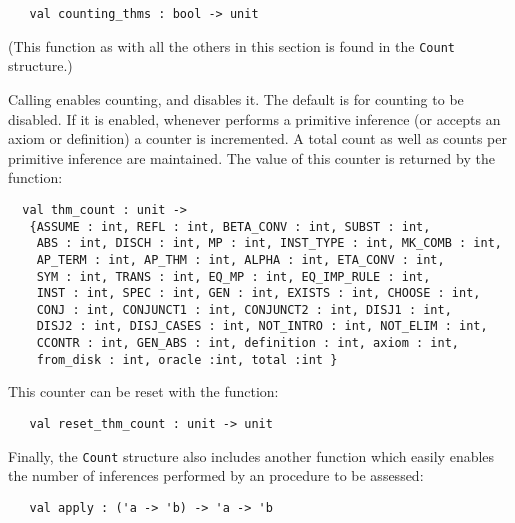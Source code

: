 \begin{holboxed}
\begin{verbatim}
   val counting_thms : bool -> unit
\end{verbatim}
\end{holboxed}

\noindent (This function as with all the others in this section is
found in the \texttt{Count} structure.)

Calling  enables counting, and
 disables it.  The default is for counting to
be disabled.  If it is enabled, whenever \HOL{} performs a primitive
inference (or accepts an axiom or definition) a counter is
incremented.  A total count as well as counts per primitive inference
are maintained.  The value of this counter is returned by the
function:

\begin{holboxed}
\begin{verbatim}
  val thm_count : unit ->
   {ASSUME : int, REFL : int, BETA_CONV : int, SUBST : int,
    ABS : int, DISCH : int, MP : int, INST_TYPE : int, MK_COMB : int,
    AP_TERM : int, AP_THM : int, ALPHA : int, ETA_CONV : int,
    SYM : int, TRANS : int, EQ_MP : int, EQ_IMP_RULE : int,
    INST : int, SPEC : int, GEN : int, EXISTS : int, CHOOSE : int,
    CONJ : int, CONJUNCT1 : int, CONJUNCT2 : int, DISJ1 : int,
    DISJ2 : int, DISJ_CASES : int, NOT_INTRO : int, NOT_ELIM : int,
    CCONTR : int, GEN_ABS : int, definition : int, axiom : int,
    from_disk : int, oracle :int, total :int }
\end{verbatim}\end{holboxed}

\noindent This counter can be reset with the function:

\begin{holboxed}
\begin{verbatim}
   val reset_thm_count : unit -> unit
\end{verbatim}\end{holboxed}

Finally, the \texttt{Count} structure also includes another function
which easily enables the number of inferences performed by an \ML{}
procedure to be assessed:

\begin{holboxed}
\begin{verbatim}
   val apply : ('a -> 'b) -> 'a -> 'b
\end{verbatim}
\end{holboxed}

